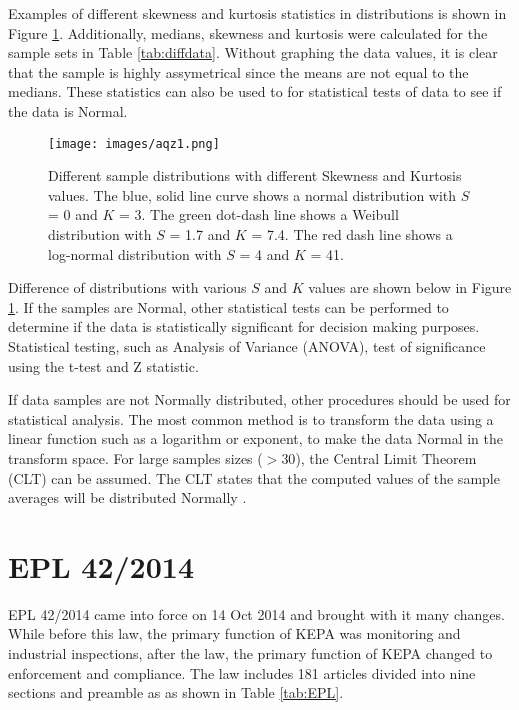 Examples of different skewness and kurtosis statistics in distributions is shown in Figure \ref{fig:distr}. Additionally, medians, skewness and kurtosis were calculated for the sample sets in Table \ref{tab:diffdata}. Without graphing the data values, it is clear that the sample is highly assymetrical since the means are not equal to the medians. These statistics can also be used to for statistical tests of data to see if the data is Normal. 
%
\begin{figure}[!htpb]
\centering
\texttt{[image: images/aqz1.png]} 
\caption[Different sample distributions with different Skewness and Kurtosis values.]{Different sample distributions with different Skewness and Kurtosis values. The blue, solid line curve shows a normal distribution with $S$ = 0 and $K$ = 3. The green dot-dash line shows a Weibull distribution with $S$ = 1.7 and $K$ = 7.4.  The red dash line shows a log-normal distribution with $S$ = 4 and $K$ = 41. }
\label{fig:distr}
\end{figure}
%
Difference of distributions with various $S$ and $K$ values are shown below in Figure \ref{fig:distr}.  If the samples are Normal, other statistical tests can be performed to determine if the data is statistically significant for decision making purposes. Statistical testing, such as Analysis of Variance (ANOVA), test of significance using the t-test and Z statistic.

If data samples are not Normally distributed, other procedures should be used for statistical analysis. The most common method is to transform the data using a linear function such as a logarithm or exponent, to make the data Normal in the transform space. For large samples sizes ($>30$), the Central Limit Theorem (CLT) can be assumed. The CLT states that the computed values of the sample averages will be distributed Normally \citep{Freeman2017}. 

\section{EPL 42/2014}

EPL 42/2014 came into force on 14 Oct 2014 and brought with it many changes. While before this law, the primary function of KEPA was monitoring and industrial inspections, after the law, the primary function of KEPA changed to enforcement and compliance. The law includes 181 articles divided into nine sections and preamble as as shown in Table \ref{tab:EPL}.

